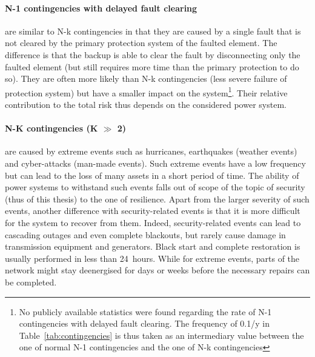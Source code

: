 \paragraph*{N-1 contingencies with delayed fault clearing} are similar to N-k contingencies in that they are caused by a single fault that is not cleared by the primary protection system of the faulted element. The difference is that the backup is able to clear the fault by disconnecting only the faulted element (but still requires more time than the primary protection to do so). They are often more likely than N-k contingencies (less severe failure of protection system) but have a smaller impact on the system\footnote{No publicly available statistics were found regarding the rate of N-1 contingencies with delayed fault clearing. The frequency of 0.1/y in Table~\ref{tab:contingencies} is thus taken as an intermediary value between the one of normal N-1 contingencies and the one of N-k contingencies}. Their relative contribution to the total risk thus depends on the considered power system.


\paragraph*{N-K contingencies (K \(\gg\) 2)} are caused by extreme events such as hurricanes, earthquakes (weather events) and cyber-attacks (man-made events). Such extreme events have a low frequency but can lead to the loss of many assets in a short period of time. The ability of power systems to withstand such events falls out of scope of the topic of security (thus of this thesis) to the one of resilience. Apart from the larger severity of such events, another difference with security-related events is that it is more difficult for the system to recover from them. Indeed, security-related events can lead to cascading outages and even complete blackouts, but rarely cause damage in transmission equipment and generators. Black start and complete restoration is usually performed in less than 24~hours. While for extreme events, parts of the network might stay deenergised for days or weeks before the necessary repairs can be completed.




